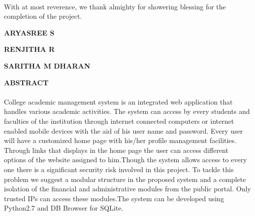 \documentclass[a4paper, 12pt]{report}
\begin{document}
\begin{titlepage}
{\paragraph{}With at most reverence, we thank almighty for showering blessing for the completion of the project.}
\begin{flushright}
\hspace{90pt}\textbf{ ARYASREE S}
\end{flushright}
\begin{flushright}
\hspace{90pt} \textbf{ RENJITHA R}
\end{flushright}
\begin{flushright}
\hspace{90pt}\textbf{ SARITHA M DHARAN}
	
\end{flushright}

\end{titlepage}

\newpage

\renewcommand*\contentsname{INDEX}
\renewcommand\thesection{\arabic{section}}

\tableofcontents
\newpage
\pagestyle{fancy}
\lhead{}
\rfoot{\thepage}
\cfoot{}
\renewcommand{\headrulewidth}{0.4pt}
\renewcommand{\footrulewidth}{0.4pt}
\begin{titlepage}

{\fontsize{16pt}{16pt}\selectfont\bfseries\center ABSTRACT \par}
\fontsize{12pt}{12pt}\selectfont
\paragraph{}College academic  management system is an integrated web application that handles various academic activities. The system can access by every students  and faculties of the institution through internet connected computers or internet enabled mobile devices with the aid of his user name and password. Every user will have a customized home page with his/her profile management facilities. Through links that displays in the home page the user can access different options of the website assigned to him.Though the system allows access to every one there is a significant security risk involved in this project. To tackle this problem we suggest a modular structure in the proposed system and a complete isolation of the financial and administrative modules from the public portal. Only trusted IPs can access these modules.The system can be developed using Python2.7 and DB Browser for SQLite.


\end{titlepage}
\end{document}
